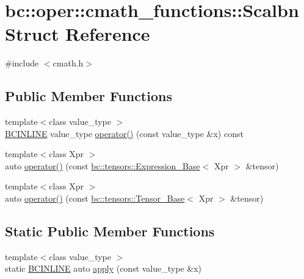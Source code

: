 \hypertarget{structbc_1_1oper_1_1cmath__functions_1_1Scalbn}{}\section{bc\+:\+:oper\+:\+:cmath\+\_\+functions\+:\+:Scalbn Struct Reference}
\label{structbc_1_1oper_1_1cmath__functions_1_1Scalbn}


{\ttfamily \#include $<$cmath.\+h$>$}

\subsection*{Public Member Functions}
\begin{DoxyCompactItemize}
\item 
{\footnotesize template$<$class value\+\_\+type $>$ }\\\hyperlink{common_8h_a6699e8b0449da5c0fafb878e59c1d4b1}{B\+C\+I\+N\+L\+I\+NE} value\+\_\+type \hyperlink{structbc_1_1oper_1_1cmath__functions_1_1Scalbn_ab45821eefa3f8f78c54fa7bd5a9a31a7}{operator()} (const value\+\_\+type \&x) const
\item 
{\footnotesize template$<$class Xpr $>$ }\\auto \hyperlink{structbc_1_1oper_1_1cmath__functions_1_1Scalbn_ae83112663ec2b38554365d2cca57603b}{operator()} (const \hyperlink{classbc_1_1tensors_1_1Expression__Base}{bc\+::tensors\+::\+Expression\+\_\+\+Base}$<$ Xpr $>$ \&tensor)
\item 
{\footnotesize template$<$class Xpr $>$ }\\auto \hyperlink{structbc_1_1oper_1_1cmath__functions_1_1Scalbn_af856613b8e711f1c03447bc38d995af0}{operator()} (const \hyperlink{classbc_1_1tensors_1_1Tensor__Base}{bc\+::tensors\+::\+Tensor\+\_\+\+Base}$<$ Xpr $>$ \&tensor)
\end{DoxyCompactItemize}
\subsection*{Static Public Member Functions}
\begin{DoxyCompactItemize}
\item 
{\footnotesize template$<$class value\+\_\+type $>$ }\\static \hyperlink{common_8h_a6699e8b0449da5c0fafb878e59c1d4b1}{B\+C\+I\+N\+L\+I\+NE} auto \hyperlink{structbc_1_1oper_1_1cmath__functions_1_1Scalbn_a6fa1810b2590260bee13e9dfd0070b41}{apply} (const value\+\_\+type \&x)
\end{DoxyCompactItemize}


